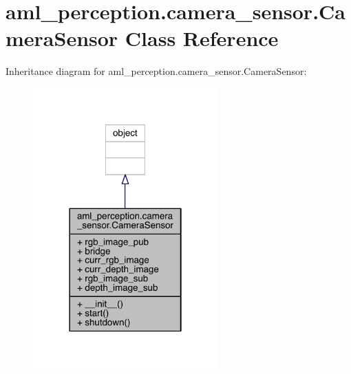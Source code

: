 \hypertarget{classaml__perception_1_1camera__sensor_1_1_camera_sensor}{}\section{aml\+\_\+perception.\+camera\+\_\+sensor.\+Camera\+Sensor Class Reference}
\label{classaml__perception_1_1camera__sensor_1_1_camera_sensor}


Inheritance diagram for aml\+\_\+perception.\+camera\+\_\+sensor.\+Camera\+Sensor\+:
\nopagebreak
\begin{figure}[H]
\begin{center}
\leavevmode
\includegraphics[width=201pt]{classaml__perception_1_1camera__sensor_1_1_camera_sensor__inherit__graph}
\end{center}
\end{figure}


